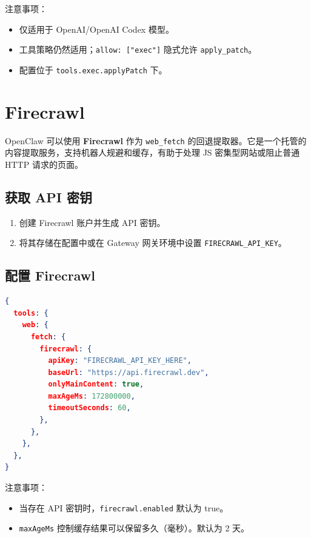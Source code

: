 注意事项：

\begin{itemize}
  \item 仅适用于 OpenAI/OpenAI Codex 模型。
  \item 工具策略仍然适用；\texttt{allow: ["exec"]} 隐式允许 \texttt{apply\_patch}。
  \item 配置位于 \texttt{tools.exec.applyPatch} 下。
\end{itemize}



\clearpage

\section{Firecrawl}


OpenClaw 可以使用 \textbf{Firecrawl} 作为 \texttt{web\_fetch} 的回退提取器。它是一个托管的
内容提取服务，支持机器人规避和缓存，有助于处理
JS 密集型网站或阻止普通 HTTP 请求的页面。

\subsection{获取 API 密钥}


\begin{enumerate}
  \item 创建 Firecrawl 账户并生成 API 密钥。
  \item 将其存储在配置中或在 Gateway 网关环境中设置 \texttt{FIRECRAWL\_API\_KEY}。
\end{enumerate}


\subsection{配置 Firecrawl}


\begin{lstlisting}[language=json]
{
  tools: {
    web: {
      fetch: {
        firecrawl: {
          apiKey: "FIRECRAWL_API_KEY_HERE",
          baseUrl: "https://api.firecrawl.dev",
          onlyMainContent: true,
          maxAgeMs: 172800000,
          timeoutSeconds: 60,
        },
      },
    },
  },
}
\end{lstlisting}


注意事项：

\begin{itemize}
  \item 当存在 API 密钥时，\texttt{firecrawl.enabled} 默认为 true。
  \item \texttt{maxAgeMs} 控制缓存结果可以保留多久（毫秒）。默认为 2 天。
\end{itemize}


